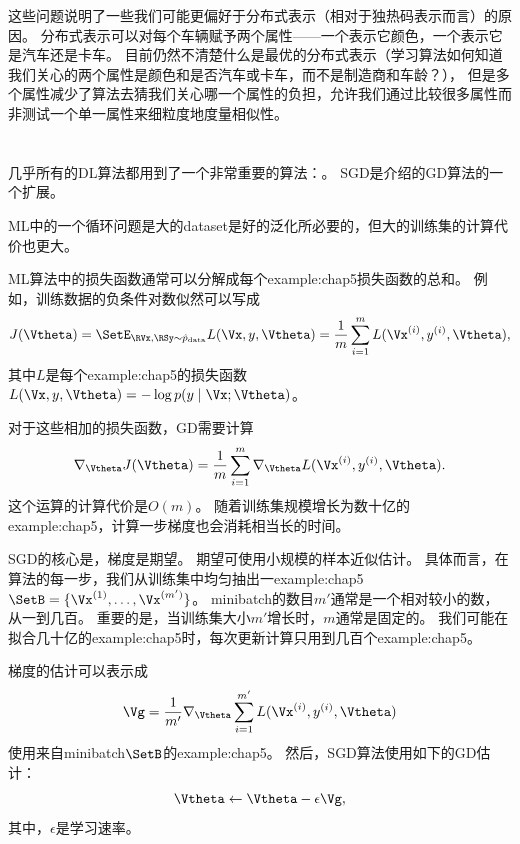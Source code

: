 
这些问题说明了一些我们可能更偏好于分布式表示（相对于独热码表示而言）的原因。
分布式表示可以对每个车辆赋予两个属性——一个表示它颜色，一个表示它是汽车还是卡车。
目前仍然不清楚什么是最优的分布式表示（学习算法如何知道我们关心的两个属性是颜色和是否汽车或卡车，而不是制造商和车龄？），
但是多个属性减少了算法去猜我们关心哪一个属性的负担，允许我们通过比较很多属性而非测试一个单一属性来细粒度地度量相似性。

\section{}
\label{sec:stochastic_gradient_descent_chap5}
几乎所有的\gls{DL}算法都用到了一个非常重要的算法：。
\gls{SGD}是介绍的\gls{GD}算法的一个扩展。

\gls{ML}中的一个循环问题是大的\gls{dataset}是好的泛化所必要的，但大的训练集的计算代价也更大。


\gls{ML}算法中的损失函数通常可以分解成每个\gls{example:chap5}损失函数的总和。
例如，训练数据的负条件对数似然可以写成
\begin{equation}
    J(\Vtheta) = \SetE_{\RVx,\RSy \sim \hat{p}_{\text{data}}}
    L(\Vx, y, \Vtheta) = 
    \frac{1}{m} \sum_{i=1}^m  L(\Vx^{(i)}, y^{(i)}, \Vtheta) ,
\end{equation}
其中$L$是每个\gls{example:chap5}的损失函数$L(\Vx, y, \Vtheta) = -\log p(y\mid\Vx;\Vtheta)$。

对于这些相加的损失函数，\gls{GD}需要计算
\begin{equation}
    \nabla_{\Vtheta} J(\Vtheta)
    = \frac{1}{m} \sum_{i=1}^m  
    \nabla_{\Vtheta} L(\Vx^{(i)}, y^{(i)}, \Vtheta) .
\end{equation}
这个运算的计算代价是$O(m)$。
随着训练集规模增长为数十亿的\gls{example:chap5}，计算一步梯度也会消耗相当长的时间。

\gls{SGD}的核心是，梯度是期望。
期望可使用小规模的样本近似估计。
具体而言，在算法的每一步，我们从训练集中均匀抽出一\gls{example:chap5}$\SetB=\{\Vx^{(1)},\dots,\Vx^{(m')}\}$。
\gls{minibatch}的数目$m'$通常是一个相对较小的数，从一到几百。
重要的是，当训练集大小$m'$增长时，$m$通常是固定的。
我们可能在拟合几十亿的\gls{example:chap5}时，每次更新计算只用到几百个\gls{example:chap5}。

梯度的估计可以表示成
\begin{equation}
    \Vg = \frac{1}{m'} \nabla_{\Vtheta} \sum_{i=1}^{m'}
    L(\Vx^{(i)}, y^{(i)}, \Vtheta)
\end{equation}
使用来自\gls{minibatch}$\SetB$的\gls{example:chap5}。
然后，\gls{SGD}算法使用如下的\gls{GD}估计：
\begin{equation}
    \Vtheta \leftarrow \Vtheta - \epsilon \Vg,
\end{equation}
其中，$\epsilon$是学习速率。

